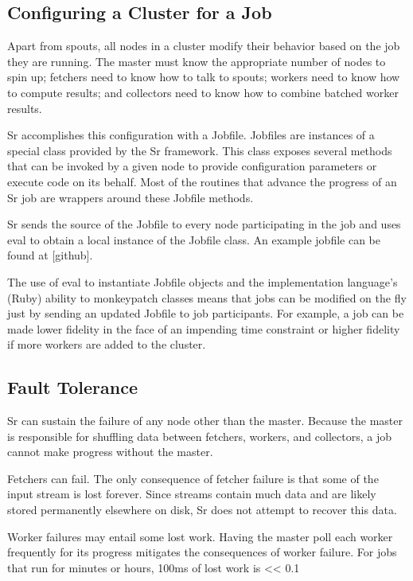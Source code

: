\documentclass[12pt]{article}
\begin{document}
\subsection{Configuring a Cluster for a Job}
Apart from spouts, all nodes in a cluster modify their behavior based on the job they are running. The master must know the appropriate number of nodes to spin up; fetchers need to know how to talk to spouts; workers need to know how to compute results; and collectors need to know how to combine batched worker results.

Sr accomplishes this configuration with a Jobfile. Jobfiles are instances of a special class provided by the Sr framework. This class exposes several methods that can be invoked by a given node to provide configuration parameters or execute code on its behalf. Most of the routines that advance the progress of an Sr job are wrappers around these Jobfile methods.

Sr sends the source of the Jobfile to every node participating in the job and uses eval to obtain a local instance of the Jobfile class. An example jobfile can be found at [github].

The use of eval to instantiate Jobfile objects and the implementation language’s (Ruby) ability to monkeypatch classes means that jobs can be modified on the fly just by sending an updated Jobfile to job participants. For example, a job can be made lower fidelity in the face of an impending time constraint or higher fidelity if more workers are added to the cluster.
\subsection{Fault Tolerance}
Sr can sustain the failure of any node other than the master. Because the master is responsible for shuffling data between fetchers, workers, and collectors, a job cannot make progress without the master.

Fetchers can fail. The only consequence of fetcher failure is that some of the input stream is lost forever. Since streams contain much data and are likely stored permanently elsewhere on disk, Sr does not attempt to recover this data.

Worker failures may entail some lost work. Having the master poll each worker frequently for its progress mitigates the consequences of worker failure. For jobs that run for minutes or hours, 100ms of lost work is << 0.1%
\end{document}
